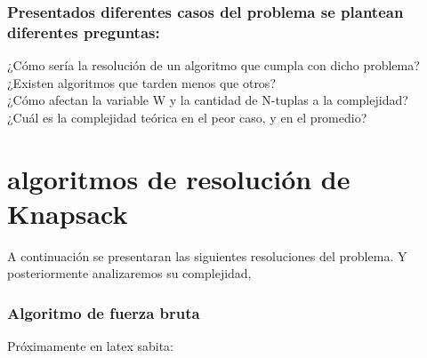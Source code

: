\documentclass[fleqn, 11pt]{article}
\begin{document}
\subsubsection{Presentados diferentes casos del problema se plantean diferentes preguntas:}

¿Cómo sería la resolución de un algoritmo que cumpla con dicho problema?  \\
¿Existen algoritmos que tarden menos que otros?  \\
¿Cómo afectan la variable W y la cantidad de N-tuplas a la complejidad? \\ 
¿Cuál es la complejidad teórica en el peor caso, y en el promedio?  \\

\maketitle
\section{algoritmos de resolución de Knapsack} 

A continuación se presentaran las siguientes resoluciones del problema. Y posteriormente analizaremos su complejidad, 

\subsubsection{Algoritmo de fuerza bruta}

Próximamente en latex sabita:
\end{document}
